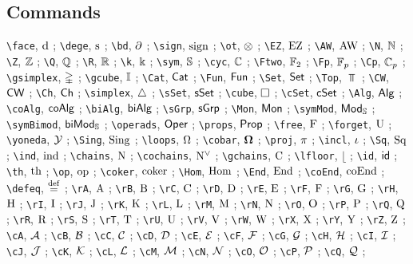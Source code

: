 \subsection*{Commands} 

\verb|\face|, $\operatorname{d}$ ; 
\verb|\dege|, $\operatorname{s}$ ; 
\verb|\bd|, $\operatorname{\partial}$ ; 
\verb|\sign|, $\operatorname{sign}$ ; 
\verb|\ot|, $\otimes$ ; 
\verb|\EZ|, $\operatorname{EZ}$ ; 
\verb|\AW|, $\operatorname{AW}$ ; 
\verb|\N|, $\mathbb{N}$ ; 
\verb|\Z|, $\mathbb{Z}$ ; 
\verb|\Q|, $\mathbb{Q}$ ; 
\verb|\R|, $\mathbb{R}$ ; 
\verb|\k|, $\Bbbk$ ; 
\verb|\sym|, $\mathbb{S}$ ; 
\verb|\cyc|, $\mathbb{C}$ ; 
\verb|\Ftwo|, ${\mathbb{F}_2}$ ; 
\verb|\Fp|, ${\mathbb{F}_p}$ ; 
\verb|\Cp|, ${\mathbb{C}_p}$ ; 
\verb|\gsimplex|, $\mathbb{\Delta}$ ; 
\verb|\gcube|, $\mathbb{I}$ ; 
\verb|\Cat|, $\mathsf{Cat}$ ; 
\verb|\Fun|, $\mathsf{Fun}$ ; 
\verb|\Set|, $\mathsf{Set}$ ; 
\verb|\Top|, $\Top$ ; 
\verb|\CW|, $\mathsf{CW}$ ; 
\verb|\Ch|, $\mathsf{Ch}$ ; 
\verb|\simplex|, $\triangle$ ; 
\verb|\sSet|, $\mathsf{sSet}$ ; 
\verb|\cube|, $\square$ ; 
\verb|\cSet|, $\mathsf{cSet}$ ; 
\verb|\Alg|, $\mathsf{Alg}$ ; 
\verb|\coAlg|, $\mathsf{coAlg}$ ; 
\verb|\biAlg|, $\mathsf{biAlg}$ ; 
\verb|\sGrp|, $\mathsf{sGrp}$ ; 
\verb|\Mon|, $\mathsf{Mon}$ ; 
\verb|\symMod|, $\mathsf{Mod}_{\mathbb{S}}$ ; 
\verb|\symBimod|, $\mathsf{biMod}_{\mathbb{S}}$ ; 
\verb|\operads|, $\mathsf{Oper}$ ; 
\verb|\props|, $\mathsf{Prop}$ ; 
\verb|\free|, $\operatorname{F}$ ; 
\verb|\forget|, $\operatorname{U}$ ; 
\verb|\yoneda|, $\operatorname{\mathcal{Y}}$ ; 
\verb|\Sing|, $\operatorname{Sing}$ ; 
\verb|\loops|, $\Omega$ ; 
\verb|\cobar|, $\operatorname{\mathbf{\Omega}}$ ; 
\verb|\proj|, $\operatorname{\pi}$ ; 
\verb|\incl|, $\operatorname{\iota}$ ; 
\verb|\Sq|, $\operatorname{Sq}$ ; 
\verb|\ind|, $\operatorname{ind}$ ; 
\verb|\chains|, $\operatorname{N}$ ; 
\verb|\cochains|, $\operatorname{N^{\vee}}$ ; 
\verb|\gchains|, $\operatorname{C}$ ; 
\verb|\lfloor|, $\lfloor$ ; 
\verb|\id|, $\mathsf{id}$ ; 
\verb|\th|, $\mathrm{th}$ ; 
\verb|\op|, $\mathrm{op}$ ; 
\verb|\coker|, $\operatorname{coker}$ ; 
\verb|\Hom|, $\mathrm{Hom}$ ; 
\verb|\End|, $\mathrm{End}$ ; 
\verb|\coEnd|, $\mathrm{coEnd}$ ; 
\verb|\defeq|, $\stackrel{\mathrm{def}}{=}$ ; 
\verb|\rA|, $\mathrm{A}$ ; 
\verb|\rB|, $\mathrm{B}$ ; 
\verb|\rC|, $\mathrm{C}$ ; 
\verb|\rD|, $\mathrm{D}$ ; 
\verb|\rE|, $\mathrm{E}$ ; 
\verb|\rF|, $\mathrm{F}$ ; 
\verb|\rG|, $\mathrm{G}$ ; 
\verb|\rH|, $\mathrm{H}$ ; 
\verb|\rI|, $\mathrm{I}$ ; 
\verb|\rJ|, $\mathrm{J}$ ; 
\verb|\rK|, $\mathrm{K}$ ; 
\verb|\rL|, $\mathrm{L}$ ; 
\verb|\rM|, $\mathrm{M}$ ; 
\verb|\rN|, $\mathrm{N}$ ; 
\verb|\rO|, $\mathrm{O}$ ; 
\verb|\rP|, $\mathrm{P}$ ; 
\verb|\rQ|, $\mathrm{Q}$ ; 
\verb|\rR|, $\mathrm{R}$ ; 
\verb|\rS|, $\mathrm{S}$ ; 
\verb|\rT|, $\mathrm{T}$ ; 
\verb|\rU|, $\mathrm{U}$ ; 
\verb|\rV|, $\mathrm{V}$ ; 
\verb|\rW|, $\mathrm{W}$ ; 
\verb|\rX|, $\mathrm{X}$ ; 
\verb|\rY|, $\mathrm{Y}$ ; 
\verb|\rZ|, $\mathrm{Z}$ ; 
\verb|\cA|, $\mathcal{A}$ ; 
\verb|\cB|, $\mathcal{B}$ ; 
\verb|\cC|, $\mathcal{C}$ ; 
\verb|\cD|, $\mathcal{D}$ ; 
\verb|\cE|, $\mathcal{E}$ ; 
\verb|\cF|, $\mathcal{F}$ ; 
\verb|\cG|, $\mathcal{G}$ ; 
\verb|\cH|, $\mathcal{H}$ ; 
\verb|\cI|, $\mathcal{I}$ ; 
\verb|\cJ|, $\mathcal{J}$ ; 
\verb|\cK|, $\mathcal{K}$ ; 
\verb|\cL|, $\mathcal{L}$ ; 
\verb|\cM|, $\mathcal{M}$ ; 
\verb|\cN|, $\mathcal{N}$ ; 
\verb|\cO|, $\mathcal{O}$ ; 
\verb|\cP|, $\mathcal{P}$ ; 
\verb|\cQ|, $\mathcal{Q}$ ; 
